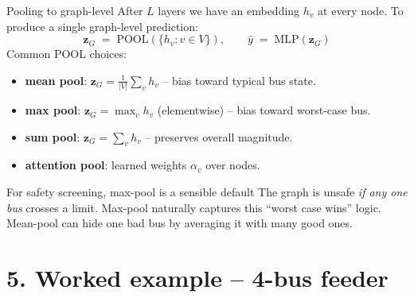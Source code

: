 \documentclass[aspectratio=169,10pt]{beamer}
\begin{document}
\begin{frame}{Pooling to graph-level}
After $L$ layers we have an embedding $h_v$ at every node. To produce a single graph-level prediction:
\begin{equation*}
\mathbf{z}_G \;=\; \text{POOL}(\{h_v : v \in V\}), \qquad \hat{y} \;=\; \text{MLP}(\mathbf{z}_G)
\end{equation*}
\vspace{0.2em}
Common POOL choices:
\begin{itemize}
  \item \textbf{mean pool}: $\mathbf{z}_G = \tfrac{1}{|V|} \sum_v h_v$ -- bias toward typical bus state.
  \item \textbf{max pool}: $\mathbf{z}_G = \max_v h_v$ (elementwise) -- bias toward worst-case bus.
  \item \textbf{sum pool}: $\mathbf{z}_G = \sum_v h_v$ -- preserves overall magnitude.
  \item \textbf{attention pool}: learned weights $\alpha_v$ over nodes.
\end{itemize}
\vspace{0.3em}
\begin{alertblock}{For safety screening, max-pool is a sensible default}
The graph is unsafe \emph{if any one bus} crosses a limit. Max-pool naturally captures this ``worst case wins'' logic. Mean-pool can hide one bad bus by averaging it with many good ones.
\end{alertblock}
\end{frame}

\section*{5. Worked example -- 4-bus feeder}
\end{document}
